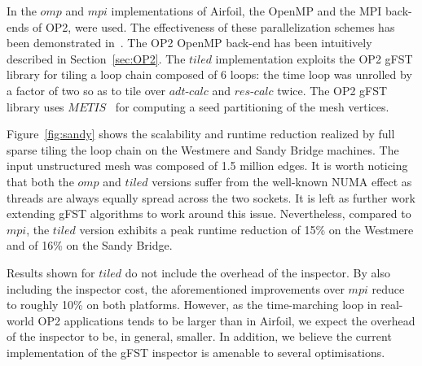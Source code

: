 In the $omp$ and $mpi$ implementations of Airfoil, the OpenMP and the MPI back-ends of OP2, were used. The effectiveness of these parallelization schemes has been demonstrated in~\cite{op2-main}. The OP2 OpenMP back-end has been intuitively described in Section~\ref{sec:OP2}. The $tiled$ implementation exploits the OP2 gFST library for tiling a loop chain composed of 6 loops: the time loop was unrolled by a factor of two so as to tile over $adt$-$calc$ and $res$-$calc$ twice. The OP2 gFST library uses $METIS$~\citep{METIS} for computing a seed partitioning
of the mesh vertices.

Figure~\ref{fig:sandy} shows the scalability and runtime reduction realized by full sparse tiling the loop chain on the Westmere and Sandy Bridge machines. The input unstructured mesh was composed of 1.5 million edges. It is worth noticing that both the $omp$ and $tiled$ versions suffer from the well-known NUMA effect as threads are always equally spread across the two sockets. It is left as further work extending gFST algorithms to work around this issue. Nevertheless, compared to $mpi$, the $tiled$ version exhibits a peak runtime reduction of 15\% on the Westmere and of 16\% on the Sandy Bridge.  %


Results shown for $tiled$ do not include the overhead of the inspector. By also including the inspector cost, the aforementioned improvements over $mpi$ reduce to roughly 10\% on both platforms. However, as the time-marching loop in real-world OP2 applications tends to be larger than in Airfoil, we expect the overhead of the inspector to be, in general, smaller. In addition, we believe the current implementation of the gFST inspector is amenable to several optimisations. 


